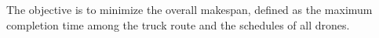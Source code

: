 \documentclass[3p, authoryear, 11pt]{elsarticle}
\newtheorem{remark}{Remark}
\begin{document}


The objective is to minimize the overall makespan, defined as the maximum completion time among the truck route and the schedules of all drones.

    
\end{document}

